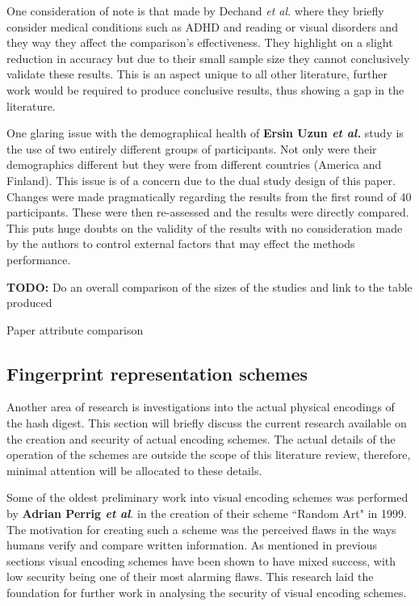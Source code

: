 One consideration of note is that made by Dechand \textit{et al.} \cite{dechand2016empirical} where they briefly consider medical conditions such as ADHD and reading or visual disorders and they way they affect the comparison's effectiveness. They highlight on a slight reduction in accuracy but due to their small sample size they cannot conclusively validate these results. This is an aspect unique to all other literature, further work would be required to produce conclusive results, thus showing a gap in the literature.

One glaring issue with the demographical health of \textbf{Ersin Uzun \textit{et al.}}\cite{uzun2007usability} study is the use of two entirely different groups of participants. Not only were their demographics different but they were from different countries (America and Finland). This issue is of a concern due to the dual study design of this paper. Changes were made pragmatically regarding the results from the first round of 40 participants. These were then re-assessed and the results were directly compared. This puts huge doubts on the validity of the results with no consideration made by the authors to control external factors that may effect the methods performance.

\textbf{TODO: } Do an overall comparison of the sizes of the studies and link to the table produced

\begin{table}[h!]
    \makebox[\textwidth][c]{
        
    }%
    \caption{Paper attribute comparison}
    \label{tab:attacker}
\end{table}

\subsection{Fingerprint representation schemes}
Another area of research is investigations into the actual physical encodings of the hash digest. This section will briefly discuss the current research available on the creation and security of actual encoding schemes. The actual details of the operation of the schemes are outside the scope of this literature review, therefore, minimal attention will be allocated to these details.

Some of the oldest preliminary work into visual encoding schemes was performed by \textbf{Adrian Perrig \textit{et al}}\cite{perrig1999hash}. in the creation of their scheme ``Random Art" in 1999. The motivation for creating such a scheme was the perceived flaws in the ways humans verify and compare written information. As mentioned in previous sections visual encoding schemes have been shown to have mixed success, with low security being one of their most alarming flaws. This research laid the foundation for further work in analysing the security of visual encoding schemes.

